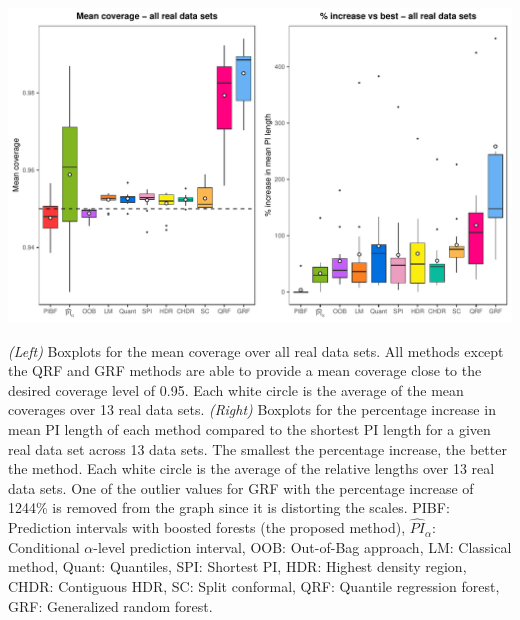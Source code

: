 \begin{widefigure}[htbp]
  \centering
  \includegraphics[scale=0.7]{global_realdata.pdf}
  \caption{\emph{(Left)} Boxplots for the mean coverage over all real data sets. All methods except the QRF and GRF methods are able to provide a mean coverage close to the desired coverage level of 0.95. Each white circle is the average of the mean coverages over 13 real data sets. \emph{(Right)} Boxplots for the percentage increase in mean PI length of each method compared to the shortest PI length for a given real data set across 13 data sets. The smallest the percentage increase, the better the method. Each white circle is the average of the relative lengths over 13 real data sets. One of the outlier values for GRF with the percentage increase of 1244\% is removed from the graph since it is distorting the scales. PIBF: Prediction intervals with boosted forests (the proposed method), $\widehat{PI}_\alpha$: Conditional $\alpha$-level prediction interval, OOB: Out-of-Bag approach, LM: Classical method, Quant: Quantiles, SPI: Shortest PI, HDR: Highest density region, CHDR: Contiguous HDR, SC: Split conformal, QRF: Quantile regression forest, GRF: Generalized random forest.}
  \label{figure:globalreal}
\end{widefigure}

